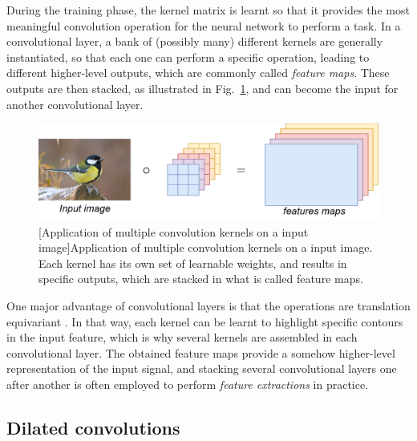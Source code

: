 During the training phase, the kernel matrix is learnt so that it provides the most meaningful convolution operation for the neural network to perform a task. In a convolutional layer, a bank of (possibly many) different  kernels are generally instantiated, so that each one can perform a specific operation, leading to different higher-level outputs, which are commonly called \textit{feature maps}. These outputs are then stacked, as illustrated in Fig.~\ref{fig:stackedConvolutionKernels}, and can become the input for another convolutional layer. 

\begin{figure}[t]
    \begin{center}
    \includegraphics[width=1.\linewidth]{Images/chap3/stackedConvolutionKernels.png}
    [Application of multiple convolution kernels on a input image]{Application of multiple convolution kernels on a input image. Each kernel has its own set of learnable weights, and results in specific outputs, which are stacked in what is called feature maps.}
    \label{fig:stackedConvolutionKernels}
    \end{center}
\end{figure}

One major advantage of convolutional layers is that the operations are translation equivariant \cite{bronstein_geometric_2021}. In that way, each kernel can be learnt to highlight specific contours in the input feature, which is why several kernels are assembled in each convolutional layer. The obtained feature maps provide a somehow higher-level representation of the input signal, and stacking several convolutional layers one after another is often employed to perform \textit{feature extractions} in practice.

\subsection{Dilated convolutions}


